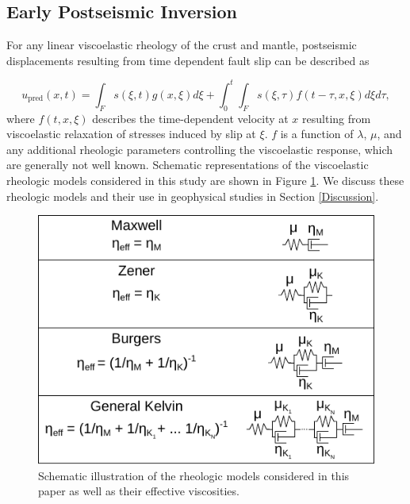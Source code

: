 \documentclass[draft,linenumbers]{AGUJournal}
\providecommand{\DIFdelbegin}{} %
\providecommand{\DIFdelend}{} %
\providecommand{\DIFaddbeginFL}{} %
\providecommand{\DIFaddendFL}{} %
\providecommand{\DIFdelbeginFL}{} %
\providecommand{\DIFdelendFL}{} %
\begin{document}
\subsection{Early Postseismic Inversion}\label{sec:InitialInversion}
\DIFdelbegin %

\DIFdelend For any linear viscoelastic rheology of the crust and mantle, postseismic displacements resulting from time dependent fault slip can be described as  

\begin{equation}\label{GeneralForward}
  u_\mathrm{pred}(x,t) = \int_F s(\xi,t)g(x,\xi)d\xi + 
           \int_0^t\int_F s(\xi,\tau) f(t-\tau,x,\xi) d\xi d\tau,
\end{equation}
where $f(t,x,\xi)$ describes the time-dependent velocity at $x$ resulting from viscoelastic relaxation of stresses induced by slip at $\xi$. $f$ is a function of $\lambda$, $\mu$, and any additional rheologic parameters controlling the viscoelastic response, which are generally not well known. Schematic representations of the viscoelastic rheologic models considered in this study are shown in Figure \ref{fig:Rheology}.  We discuss these rheologic models and their use in geophysical studies in Section \ref{Discussion}. 

\begin{figure}
\DIFdelbeginFL %
\DIFdelendFL \DIFaddbeginFL \includegraphics[scale=0.9]{Figures/2016jb013114-f08}
\DIFaddendFL \centering 
\caption{Schematic illustration of the rheologic models considered in this paper as well as their effective viscosities.}
\label{fig:Rheology}
\end{figure}
\end{document}
